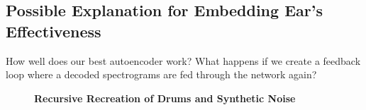 \documentclass[\main/thesis.tex]{subfiles}
\begin{document}
\subsection{Possible Explanation for Embedding Ear's Effectiveness}
How well does our best autoencoder work? What happens if we create a feedback loop where a decoded spectrograms are fed through the network again? 
\begin{figure}[h!]
\centering
\textbf{Recursive Recreation of Drums and Synthetic Noise}\par\medskip
{}
\end{figure}
\end{document}
